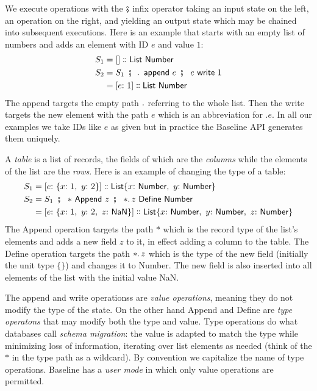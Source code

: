 \documentclass[english,submission]{programming}
\theoremstyle{definition}
\newcommand{\mathbox}[1]{\colorbox{black!10}{$#1$}}
\DeclareMathOperator{\exec}{\ \fatsemi\ \ }
\newcommand{\is}{{:}\ }
\newcommand{\comma}{,\ }
\newcommand{\isa}{\dblcolon}
\begin{document}
We execute operations with the \mathbox{\fatsemi} infix operator taking an input state on the left, an operation on the right, and yielding an output state which may be chained into subsequent executions. Here is an example that starts with an empty list of numbers and adds an element with ID $e$ and value $1$:
\begin{align*}
S_1 &= [] \isa \textsf{List Number}\\
S_2 &= S_1 \exec \ldotp \textsf{ append } e \exec e \textsf{ write } 1\\
&= [e \is 1] \isa \textsf{List Number}\\
\end{align*}
The \textsf{append} targets the empty path \mathbox{\ldotp} referring to the whole list. Then the \textsf{write} targets the new element with the path \mathbox{e} which is an abbreviation for \mathbox{.e}. In all our examples we take IDs like $e$ as given but in practice the Baseline API generates them uniquely.

A \textit{table} is a list of records, the fields of which are the \textit{columns} while the elements of the list are the \textit{rows}. Here is an example of changing the type of a table:
\begin{align*}
S_1 &= [e \is \{x \is 1 \comma  y \is 2\}] \isa \textsf{List} \{x \is \textsf{Number}\comma  y \is \textsf{Number}\}\\
S_2 &= S_1 \exec * \textsf{ Append } z \exec *\ldotp z \textsf{ Define Number}\\
 &= [e \is \{x \is 1\comma  y \is 2,\ z\is \textsf{NaN}\}] \isa \textsf{List} \{x \is \textsf{Number}\comma  y \is \textsf{Number}\comma z\is \textsf{Number}\}\\
\end{align*}
The \textsf{Append} operation targets the path \mathbox{*} which is the record type of the list's elements and adds a new field \mathbox{z} to it, in effect adding a column to the table. The \textsf{Define} operation targets the path \mathbox{*\ldotp z} which is the type of the new field (initially the unit type $\{\}$) and changes it to \textsf{Number}. The new field is also inserted into all elements of the list with the initial value \textsf{NaN}.

The \textsf{append} and \textsf{write} operationss are \textit{value operations}, meaning they do not modify the type of the state. On the other hand \textsf{Append} and \textsf{Define} are \textit{type operatons} that may modify both the type and value. Type operations do what databases call \textit{schema migration}: the value is adapted to match the type while minimizing loss of information, iterating over list elements as needed (think of the $*$ in the type path as a wildcard). By convention we capitalize the name of type operations. Baseline has a \textit{user mode} in which only value operations are permitted.
\end{document}
